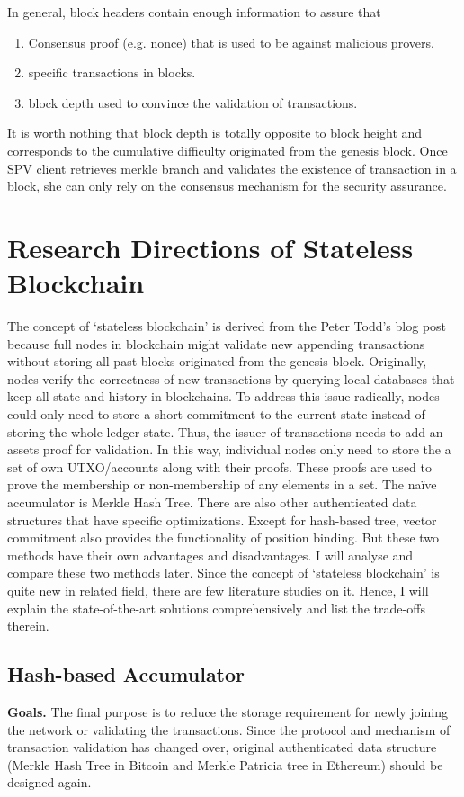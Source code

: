 \documentclass[conference]{IEEEtran}
\begin{document}
In general, block headers contain enough information to assure that 
\begin{enumerate}
  \item Consensus proof (e.g. nonce) that is used to be against malicious provers.
  \item specific transactions in blocks.
  \item block depth used to convince the validation of transactions.
\end{enumerate}

It is worth nothing that block depth is totally opposite to block height and corresponds to the cumulative difficulty originated from the genesis block.
%
Once SPV client retrieves merkle branch and validates the existence of transaction in a block, she can only rely on the consensus mechanism for the security assurance. 



\section{Research Directions of Stateless Blockchain}
%
The concept of `stateless blockchain' is derived from the Peter Todd's blog post~\cite{Tod,MMR} because full nodes in blockchain might validate new appending transactions without storing all past blocks originated from the genesis block.
%
Originally, nodes verify the correctness of new transactions by querying local databases that keep all state and history in blockchains.
%
To address this issue radically, nodes could only need to store a short commitment to the current state instead of storing the whole ledger state.
%
Thus, the issuer of transactions needs to add an assets proof for validation. 
%
In this way, individual nodes only need to store the a set of own UTXO/accounts along with their proofs.
%
These proofs are used to prove the membership or non-membership of any elements in a set.
%
The na\"ive accumulator is Merkle Hash Tree.
%
There are also other authenticated data structures that have specific optimizations.
%
Except for hash-based tree, vector commitment also provides the functionality of position binding.
%
But these two methods have their own advantages and disadvantages.
%
I will analyse and compare these two methods later.
%
Since the concept of `stateless blockchain' is quite new in related field, there are few literature studies on it.
%
Hence, I will explain the state-of-the-art solutions comprehensively and list the trade-offs therein.


\subsection{Hash-based Accumulator}
\textbf{Goals.} The final purpose is to reduce the storage requirement for newly joining the network or validating the transactions.
%
Since the protocol and mechanism of transaction validation has changed over, original authenticated data structure (Merkle Hash Tree in Bitcoin and Merkle Patricia tree in Ethereum) should be designed again. 
\end{document}
